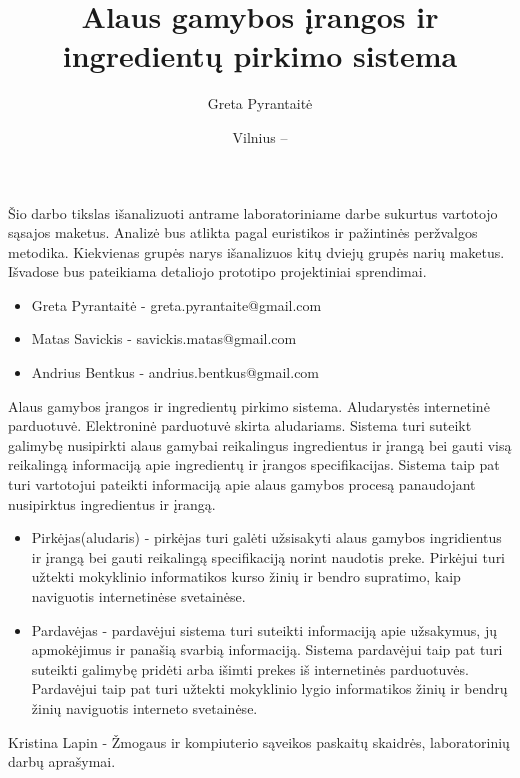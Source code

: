 \documentclass[oneside]{VUMIFPSkursinis}
\title{Alaus gamybos įrangos ir ingredientų pirkimo sistema}
\author{Greta Pyrantaitė}
\date{Vilnius – \the\year}
\begin{document}
\maketitle

Šio darbo tikslas išanalizuoti antrame laboratoriniame darbe sukurtus vartotojo sąsajos maketus. Analizė bus atlikta pagal euristikos ir pažintinės peržvalgos metodika. Kiekvienas grupės narys išanalizuos kitų dviejų grupės narių maketus. Išvadose bus pateikiama detaliojo prototipo projektiniai sprendimai.

\begin{itemize}
	\item{Greta Pyrantaitė - greta.pyrantaite@gmail.com}
	\item{Matas Savickis - savickis.matas@gmail.com}
	\item{Andrius Bentkus - andrius.bentkus@gmail.com}
\end{itemize}

\tableofcontents

		Alaus gamybos įrangos ir ingredientų pirkimo sistema.
		Aludarystės internetinė parduotuvė.
		Elektroninė parduotuvė skirta aludariams.
		Sistema turi suteikt galimybę nusipirkti alaus gamybai reikalingus ingredientus ir įrangą bei gauti visą reikalingą informaciją apie ingredientų ir įrangos specifikacijas.
		Sistema taip pat turi vartotojui pateikti informaciją apie alaus gamybos procesą panaudojant nusipirktus ingredientus ir įrangą.
		\begin{itemize}
			\item{Pirkėjas(aludaris) - pirkėjas turi galėti užsisakyti alaus gamybos ingridientus ir įrangą bei gauti reikalingą specifikaciją norint naudotis preke.
				Pirkėjui turi užtekti mokyklinio informatikos kurso žinių ir bendro supratimo, kaip naviguotis internetinėse svetainėse.}
			\item{Pardavėjas - pardavėjui sistema turi suteikti informaciją apie užsakymus, jų apmokėjimus ir panašią svarbią informaciją.
				Sistema pardavėjui taip pat turi suteikti galimybę pridėti arba išimti prekes iš internetinės parduotuvės.
				Pardavėjui taip pat turi užtekti mokyklinio lygio informatikos žinių ir bendrų žinių naviguotis interneto svetainėse.}
		\end{itemize}
		Kristina Lapin - Žmogaus ir kompiuterio sąveikos paskaitų skaidrės, laboratorinių darbų aprašymai.
\iffalse XXXXXXXXXXXXXXXXXXXXXXXXXXXXXXXXXXXXXXXXXXXXXXXXXXXXXXXXXXXXXXXXXXXXXXXXXXXXXXXXXXXXXXXXXXXXXXXXXXXXXXXXXXXXXXXXXXXXXXXXXXXXXXXXXXXXXXX \fi
\end{document}
